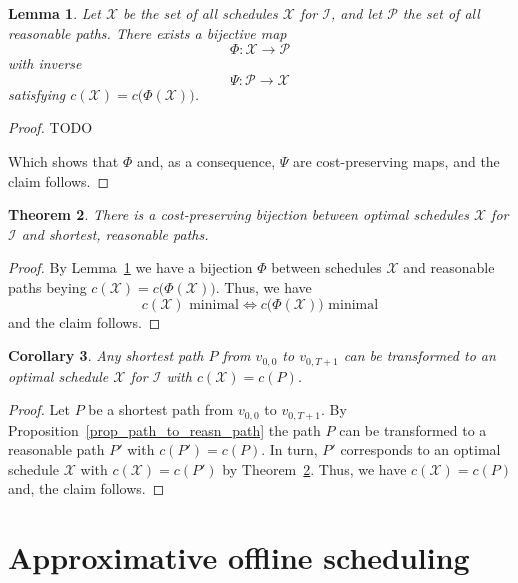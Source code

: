 \documentclass[hidelinks]{article}
\theoremstyle{plain}
\newtheorem{thm}{Theorem}[section]
\newtheorem{lem}[thm]{Lemma}
\newtheorem{cor}[thm]{Corollary}
\theoremstyle{definition}
\theoremstyle{rem}
\newcommand{\mx}{\mathcal{X}}
\newcommand{\inp}{\mathcal{I}}
\newcommand{\costs}{c}
\begin{document}
\begin{lem}\label{lem_sched_path_pseudo_lin}
Let $\bm{\mx}$ be the set of all schedules $\mx$ for $\inp$, and let $\bm{\mathcal{P}}$ the set of all reasonable paths. There exists a bijective map 
\begin{equation*}
	\Phi:\bm{\mx}\rightarrow\bm{\mathcal{P}}
\end{equation*}
with inverse
\begin{equation*}
	\Psi:\bm{\mathcal{P}}\rightarrow\bm{\mx}
\end{equation*}
satisfying $\costs(\mx)=\costs\bigl(\Phi(\mx)\bigr)$.
\end{lem}
\begin{proof}
TODO

Which shows that $\Phi$ and, as a consequence, $\Psi$ are cost-preserving maps, and the claim follows.
\end{proof}
\begin{thm}\label{thm_opt_sched_reasn_path}
There is a cost-preserving bijection between optimal schedules $\mx$ for $\inp$ and shortest, reasonable paths.
\end{thm} 
\begin{proof}
By Lemma~\ref{lem_sched_path_pseudo_lin} we have a bijection $\Phi$ between schedules $\mx$ and reasonable paths beying $\costs(\mx)=\costs\bigl(\Phi(\mx)\bigr)$. Thus, we have 
\begin{equation*}
	\costs(\mx)\text{ minimal}\iff \costs\bigl(\Phi(\mx)\big)\text{ minimal}
\end{equation*}
and the claim follows.
\end{proof}
\begin{cor}
Any shortest path $P$ from $v_{0,0}$ to $v_{0,T+1}$ can be transformed to an optimal schedule $\mx$ for $\inp$ with $\costs(\mx)=\costs(P)$.
\end{cor}
\begin{proof}
Let $P$ be a shortest path from $v_{0,0}$ to $v_{0,T+1}$. By Proposition~\ref{prop_path_to_reasn_path} the path $P$ can be transformed to a reasonable path $P'$ with $\costs(P')=\costs(P)$.
In turn, $P'$ corresponds to an optimal schedule $\mx$ with $\costs(\mx)=\costs(P')$ by Theorem~\ref{thm_opt_sched_reasn_path}. Thus, we have $c(\mx)=c(P)$ and, the claim follows.
\end{proof}

\section{Approximative offline scheduling}
\end{document}
